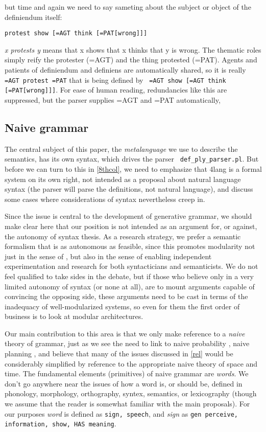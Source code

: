 \documentclass[11pt,bookmarks,bookmarksnumbered,naturalnames,plainpages=false,pdftex,colorlinks=true,urlcolor=blue,bookmarksdepth=subsection,plainpages=false]{paper}
\begin{document}
\noindent
but time and again we need to say sameting about the subject or object of the
definiendum itself: 

\begin{verbatim}
protest show [=AGT think [=PAT[wrong]]]
\end{verbatim}

\noindent
{\it x protests y} means that x shows that x thinks that y is wrong. The
thematic roles simply reify the protester (=AGT) and the thing protested
(=PAT). Agents and patients of definiendum and definiens are automatically
shared, so it is really {\tt =AGT protest =PAT} that is being defined by {\tt
  =AGT show [=AGT think [=PAT[wrong]]]}. For ease of human reading,
redundancies like this are suppressed, but the parser supplies =AGT and =PAT
automatically, 

\subsection{Naive grammar}\label{naivegrammar}

The central subject of this paper, the {\it metalanguage} we use to describe
the semantics, has its own syntax, which drives the parser {\tt
  def\_ply\_parser.pl}. But before we can turn to this in \ref{8thcol}, we need
to emphasize that 4lang is a formal system on its own right, not intended as a
proposal about natural language syntax (the parser will parse the definitions,
not natural language), and discuss some cases where considerations of syntax
nevertheless creep in.

Since the issue is central to the development of generative grammar, we should
make clear here that our position is not intended as an argument for, or
against, the autonomy of syntax thesis. As a research strategy, we prefer a
semantic formalism that is as autonomous as feasible, since this promotes
modularity not just in the sense of \cite{Fodor:1983}, but also in the sense
of enabling independent experimentation and research for both syntacticians
and semanticists. We do not feel qualified to take sides in the debate, but if
those who believe only in a very limited autonomy of syntax (or none at all),
are to mount arguments capable of convincing the opposing side, these
arguments need to be cast in terms of the inadequacy of well-modularized
systems, so even for them the first order of business is to look at modular
architectures. 

Our main contribution to this area is that we only make reference to a {\it
  naive} theory of grammar, just as we see the need to link to naive
probability \citep{Gyenis:2019}, naive planning \citep{Gordon:2017}, and
believe that many of the issues discussed in \ref{rel} would be considerably
simplified by reference to the appropriate naive theory of space and time.
The fundamental elements (primitives) of naive grammar are {\it words}. We
don't go anywhere near the issues of how a word is, or should be, defined in
phonology, morphology, orthography, syntex, semantics, or lexicography (though
we assume that the reader is somewhat familiar with the main proposals). For
our purposes {\it word} is defined as {\tt sign, speech}, and {\it sign} as
{\tt gen perceive, information, show, HAS meaning}.
\end{document}
